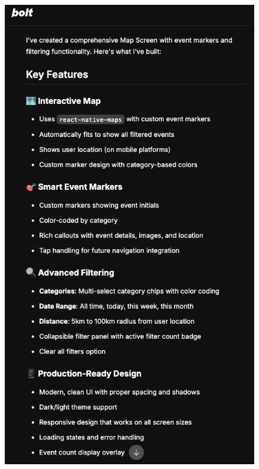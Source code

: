 \begin{figure}[htbp]
      \centering
      \vspace{1em}
      \begin{minipage}{0.48\textwidth}
            \centering
            \includegraphics[width=0.98\textwidth]{images/bolt_screenshots/eingabe des prompts-rueckmeldung von bolt-1.png}
      \end{minipage}
      \hfill
      \begin{minipage}{0.48\textwidth}

\end{minipage}
\end{figure}
